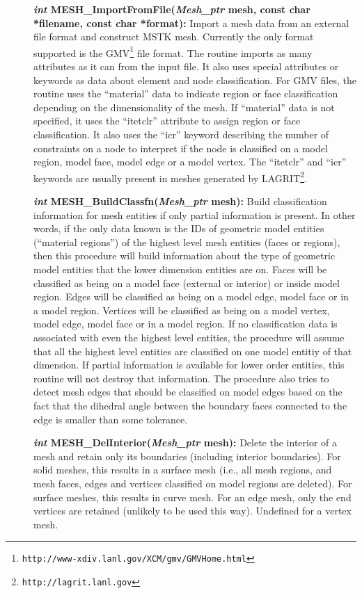 \documentclass[12pt]{article}
\begin{document}
\begin{description}
\item[]{\bf {\em int} MESH\_ImportFromFile({\em Mesh\_ptr}
    mesh, const char *filename, const char *format):} Import a mesh
  data from an external file format and construct MSTK mesh. Currently
  the only format supported is the
  GMV\footnote{\texttt{http://www-xdiv.lanl.gov/XCM/gmv/GMVHome.html}}
  file format. The routine imports as many attributes as it can from
  the input file. It also uses special attributes or keywords as data
  about element and node classification.  For GMV files, the routine
  uses the ``material'' data to indicate region or face classification
  depending on the dimensionality of the mesh. If ``material'' data is
  not specified, it uses the ``itetclr'' attribute to assign region or
  face classification. It also uses the ``icr'' keyword describing the
  number of constraints on a node to interpret if the node is
  classified on a model region, model face, model edge or a model
  vertex. The ``itetclr'' and ``icr'' keywords are usually present in
  meshes generated by
  LAGRIT\footnote{\texttt{http://lagrit.lanl.gov}}.

  
\item[]{\bf {\em int} MESH\_BuildClassfn({\em Mesh\_ptr} mesh):} Build
  classification information for mesh entities if only partial
  information is present. In other words, if the only data known is
  the IDs of geometric model entities (``material regions'') of the
  highest level mesh entities (faces or regions), then this procedure
  will build information about the type of geometric model entities
  that the lower dimension entities are on. Faces will be classified
  as being on a model face (external or interior) or inside model
  region. Edges will be classified as being on a model edge, model
  face or in a model region. Vertices will be classified as being on a
  model vertex, model edge, model face or in a model region. If no
  classification data is associated with even the highest level
  entities, the procedure will assume that all the highest level
  entities are classified on one model entitiy of that dimension. If
  partial information is available for lower order entities, this
  routine will not destroy that information. The procedure also tries
  to detect mesh edges that should be classified on model edges based
  on the fact that the dihedral angle between the boundary faces
  connected to the edge is smaller than some tolerance.



\item[]{\bf {\em int} MESH\_DelInterior({\em Mesh\_ptr}
    mesh):} Delete the interior of a mesh and retain only its
    boundaries (including interior boundaries). For solid meshes, this
    results in a surface mesh (i.e., all mesh regions, and  mesh
    faces, edges and vertices classified on model regions are deleted). For
    surface meshes, this results in curve mesh. For an edge mesh, only
    the end vertices are retained (unlikely to be used this
    way). Undefined for a vertex mesh.
  

\end{description}
\end{document}

